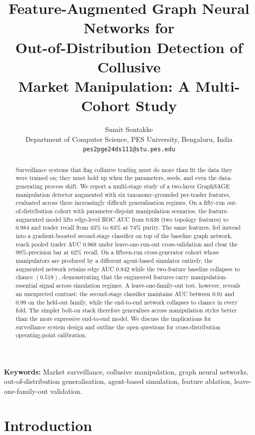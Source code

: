 \documentclass[10pt,twocolumn,letterpaper]{article}
\title{Feature-Augmented Graph Neural Networks for\\
Out-of-Distribution Detection of Collusive\\
Market Manipulation: A Multi-Cohort Study}
\author{Sumit Sontakke\\
\small Department of Computer Science, PES University, Bengaluru, India\\
\small \texttt{pes2pge24ds111@stu.pes.edu}}
\begin{document}
\maketitle

\begin{abstract}
Surveillance systems that flag collusive trading must do more than fit
the data they were trained on; they must hold up when the parameters,
seeds, and even the data-generating process shift. We report a
multi-stage study of a two-layer GraphSAGE manipulation detector
augmented with six taxonomy-grounded per-trader features, evaluated
across three increasingly difficult generalisation regimes.
On a fifty-run out-of-distribution cohort with parameter-disjoint
manipulation scenarios, the feature-augmented model lifts edge-level
ROC AUC from \(0.638\) (two topology features) to \(0.984\) and trader
recall from \(43\%\) to \(83\%\) at \(74\%\) purity. The same features,
fed instead into a gradient-boosted second-stage classifier on top of
the baseline graph network, reach pooled trader AUC \(0.968\) under
leave-one-run-out cross-validation and clear the \(99\%\)-precision bar
at \(62\%\) recall.
On a fifteen-run cross-generator cohort whose manipulators are produced
by a different agent-based simulator entirely, the augmented network
retains edge AUC \(0.842\) while the two-feature baseline collapses to
chance \((0.518)\), demonstrating that the engineered features carry
manipulation-essential signal across simulation regimes.
A leave-one-family-out test, however, reveals an unexpected contrast:
the second-stage classifier maintains AUC between \(0.91\) and \(0.99\)
on the held-out family, while the end-to-end network collapses to chance
in every fold. The simpler bolt-on stack therefore generalises across
manipulation styles better than the more expressive end-to-end model.
We discuss the implications for surveillance system design and outline
the open questions for cross-distribution operating-point calibration.
\end{abstract}

\vspace{0.5em}\noindent\textbf{Keywords:} 
Market surveillance, collusive manipulation, graph neural networks,
out-of-distribution generalisation, agent-based simulation,
feature ablation, leave-one-family-out validation.


\section{Introduction}
\label{sec:intro}
\end{document}
